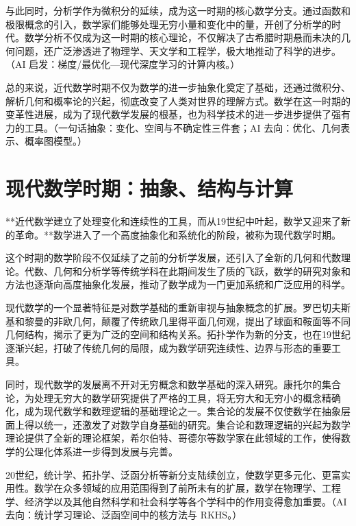 与此同时，分析学作为微积分的延续，成为这一时期的核心数学分支。通过函数和极限概念的引入，数学家们能够处理无穷小量和变化中的量，开创了分析学的时代。数学分析不仅成为这一时期的核心理论，不仅解决了古希腊时期悬而未决的几何问题，还广泛渗透进了物理学、天文学和工程学，极大地推动了科学的进步。{（AI 启发：梯度/最优化—现代深度学习的计算内核。）}


总的来说，近代数学时期不仅为数学的进一步抽象化奠定了基础，还通过微积分、解析几何和概率论的兴起，彻底改变了人类对世界的理解方式。数学在这一时期的变革性进展，成为了现代数学发展的根基，也为科学技术的进一步进步提供了强有力的工具。{（一句话抽象：变化、空间与不确定性三件套；AI 去向：优化、几何表示、概率图模型。）}

\section{现代数学时期：抽象、结构与计算}


**近代数学建立了处理变化和连续性的工具，而从19世纪中叶起，数学又迎来了新的革命。**数学进入了一个高度抽象化和系统化的阶段，被称为现代数学时期。

这个时期的数学阶段不仅延续了之前的分析学发展，还引入了全新的几何和代数理论。代数、几何和分析学等传统学科在此期间发生了质的飞跃，数学的研究对象和方法也逐渐向高度抽象化发展，推动了数学成为一门更加系统和广泛应用的科学。

现代数学的一个显著特征是对数学基础的重新审视与抽象概念的扩展。罗巴切夫斯基和黎曼的非欧几何，颠覆了传统欧几里得平面几何观，提出了球面和鞍面等不同几何结构，揭示了更为广泛的空间和结构关系。拓扑学作为新的分支，也在19世纪逐渐兴起，打破了传统几何的局限，成为数学研究连续性、边界与形态的重要工具。

同时，现代数学的发展离不开对无穷概念和数学基础的深入研究。康托尔的集合论，为处理无穷大的数学研究提供了严格的工具，将无穷大和无穷小的概念精确化，成为现代数学和数理逻辑的基础理论之一。集合论的发展不仅使数学在抽象层面上得以统一，还激发了对数学自身基础的研究。集合论和数理逻辑的兴起为数学理论提供了全新的理论框架，希尔伯特、哥德尔等数学家在此领域的工作，使得数学的公理化体系进一步得到发展与完善。

20世纪，统计学、拓扑学、泛函分析等新分支陆续创立，使数学更多元化、更富实用性。数学在众多领域的应用范围得到了前所未有的扩展，数学在物理学、工程学、经济学以及其他自然科学和社会科学等各个学科中的作用变得愈加重要。{（AI 去向：统计学习理论、泛函空间中的核方法与 RKHS。）}

